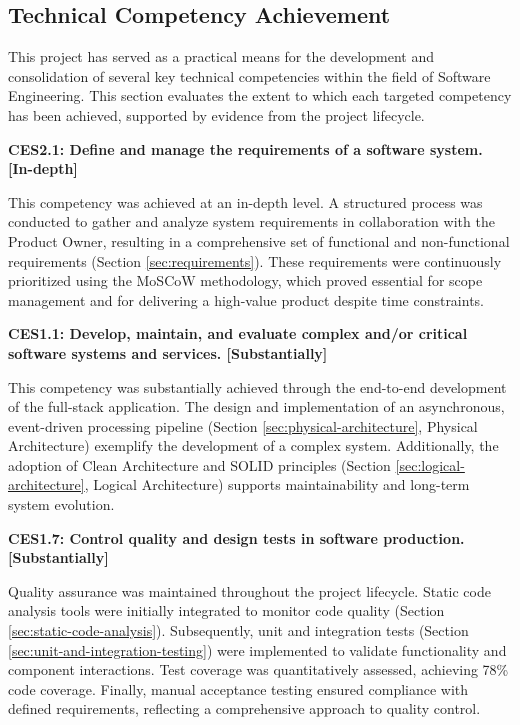 \subsection{Technical Competency Achievement}

This project has served as a practical means for the development and consolidation of several key technical competencies within the field of Software Engineering. This section evaluates the extent to which each targeted competency has been achieved, supported by evidence from the project lifecycle.

\textbf{CES2.1: Define and manage the requirements of a software system. [In-depth]}

This competency was achieved at an in-depth level. A structured process was conducted to gather and analyze system requirements in collaboration with the Product Owner, resulting in a comprehensive set of functional and non-functional requirements (Section \ref{sec:requirements}). These requirements were continuously prioritized using the MoSCoW methodology, which proved essential for scope management and for delivering a high-value product despite time constraints.

\textbf{CES1.1: Develop, maintain, and evaluate complex and/or critical software systems and services. [Substantially]}

\newpage

This competency was substantially achieved through the end-to-end development of the full-stack application. The design and implementation of an asynchronous, event-driven processing pipeline (Section \ref{sec:physical-architecture}, Physical Architecture) exemplify the development of a complex system. Additionally, the adoption of Clean Architecture and SOLID principles (Section \ref{sec:logical-architecture}, Logical Architecture) supports maintainability and long-term system evolution.

\textbf{CES1.7: Control quality and design tests in software production. [Substantially]}

Quality assurance was maintained throughout the project lifecycle. Static code analysis tools were initially integrated to monitor code quality (Section \ref{sec:static-code-analysis}). Subsequently, unit and integration tests (Section \ref{sec:unit-and-integration-testing}) were implemented to validate functionality and component interactions. Test coverage was quantitatively assessed, achieving 78\% code coverage. Finally, manual acceptance testing ensured compliance with defined requirements, reflecting a comprehensive approach to quality control.

